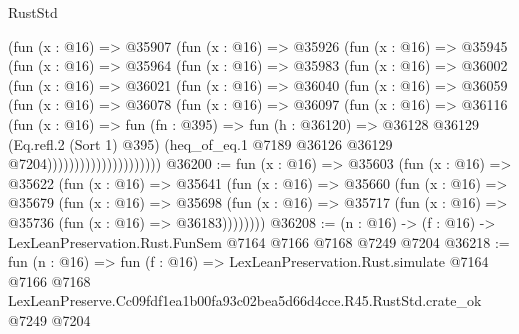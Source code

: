 \begin{lexlean}{RustStd}
\begin{coremodule}
                  (fun (x : @16) =>
                  @35907
                    (fun (x : @16) =>
                    @35926
                      (fun (x : @16) =>
                      @35945
                        (fun (x : @16) =>
                        @35964
                          (fun (x : @16) =>
                          @35983
                            (fun (x : @16) =>
                            @36002
                              (fun (x : @16) =>
                              @36021
                                (fun (x : @16) =>
                                @36040
                                  (fun (x : @16) =>
                                  @36059
                                    (fun (x : @16) =>
                                    @36078
                                      (fun (x : @16) =>
                                      @36097
                                        (fun (x : @16) =>
                                        @36116
                                          (fun (x : @16) =>
                                          fun (fn : @395) =>
                                          fun (h : @36120) =>
                                          @36128
                                            @36129
                                            (Eq.refl.{2} (Sort 1) @395)
                                            (heq_of_eq.{1}
                                              @7189
                                              @36126
                                              @36129
                                              @7204)))))))))))))))))))))
@36200 := fun (x : @16) =>
  @35603
    (fun (x : @16) =>
    @35622
      (fun (x : @16) =>
      @35641
        (fun (x : @16) =>
        @35660
          (fun (x : @16) =>
          @35679
            (fun (x : @16) =>
            @35698
              (fun (x : @16) => @35717 (fun (x : @16) => @35736 (fun (x : @16) => @36183))))))))
@36208 := (n : @16) -> (f : @16) -> LexLeanPreservation.Rust.FunSem @7164 @7166 @7168 @7249 @7204
@36218 := fun (n : @16) =>
  fun (f : @16) =>
  LexLeanPreservation.Rust.simulate
    @7164
    @7166
    @7168
    LexLeanPreserve.Cc09fdf1ea1b00fa93c02bea5d66d4cce.R45.RustStd.crate_ok
    @7249
    @7204
\end{coremodule}
\end{lexlean}

